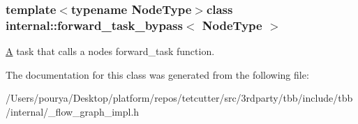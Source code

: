 \subsubsection*{template$<$typename Node\+Type$>$class internal\+::forward\+\_\+task\+\_\+bypass$<$ Node\+Type $>$}

\hyperlink{structA}{A} task that calls a node\textquotesingle{}s forward\+\_\+task function. 

The documentation for this class was generated from the following file\+:\begin{DoxyCompactItemize}
\item 
/\+Users/pourya/\+Desktop/platform/repos/tetcutter/src/3rdparty/tbb/include/tbb/internal/\+\_\+flow\+\_\+graph\+\_\+impl.\+h\end{DoxyCompactItemize}
